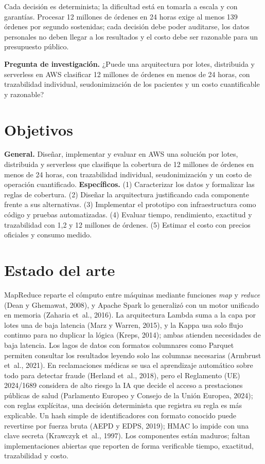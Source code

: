 \documentclass[10pt,twocolumn,letterpaper]{article}
\begin{document}
Cada decisión es determinista; la dificultad está en tomarla a escala y con garantías. Procesar 12 millones de órdenes en 24 horas exige al menos 139 órdenes por segundo sostenidas; cada decisión debe poder auditarse, los datos personales no deben llegar a los resultados y el costo debe ser razonable para un presupuesto público.

\textbf{Pregunta de investigación.} ¿Puede una arquitectura por lotes, distribuida y serverless en AWS clasificar 12 millones de órdenes en menos de 24 horas, con trazabilidad individual, seudonimización de los pacientes y un costo cuantificable y razonable?

\section{Objetivos}
\textbf{General.} Diseñar, implementar y evaluar en AWS una solución por lotes, distribuida y serverless que clasifique la cobertura de 12 millones de órdenes en menos de 24 horas, con trazabilidad individual, seudonimización y un costo de operación cuantificado.
\textbf{Específicos.} (1) Caracterizar los datos y formalizar las reglas de cobertura. (2) Diseñar la arquitectura justificando cada componente frente a sus alternativas. (3) Implementar el prototipo con infraestructura como código y pruebas automatizadas. (4) Evaluar tiempo, rendimiento, exactitud y trazabilidad con 1,2 y 12 millones de órdenes. (5) Estimar el costo con precios oficiales y consumo medido.

\section{Estado del arte}
MapReduce reparte el cómputo entre máquinas mediante funciones \emph{map} y \emph{reduce} (Dean y Ghemawat, 2008), y Apache Spark lo generalizó con un motor unificado en memoria (Zaharia et~al., 2016). La arquitectura Lambda suma a la capa por lotes una de baja latencia (Marz y Warren, 2015), y la Kappa usa solo flujo continuo para no duplicar la lógica (Kreps, 2014); ambas atienden necesidades de baja latencia. Los lagos de datos con formatos columnares como Parquet permiten consultar los resultados leyendo solo las columnas necesarias (Armbrust et~al., 2021). En reclamaciones médicas se usa el aprendizaje automático sobre todo para detectar fraude (Herland et~al., 2018), pero el Reglamento (UE) 2024/1689 considera de alto riesgo la IA que decide el acceso a prestaciones públicas de salud (Parlamento Europeo y Consejo de la Unión Europea, 2024); con reglas explícitas, una decisión determinista que registra su regla es más explicable. Un hash simple de identificadores con formato conocido puede revertirse por fuerza bruta (AEPD y EDPS, 2019); HMAC lo impide con una clave secreta (Krawczyk et~al., 1997). Los componentes están maduros; faltan implementaciones abiertas que reporten de forma verificable tiempo, exactitud, trazabilidad y costo.
\end{document}
